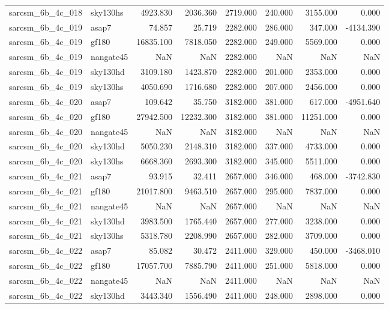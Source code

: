 \begin{tabular}{llrrrrrr}
sarcsm\_6b\_4c\_018 & sky130hs & 4923.830 & 2036.360 & 2719.000 & 240.000 & 3155.000 & 0.000 \\
sarcsm\_6b\_4c\_019 & asap7 & 74.857 & 25.719 & 2282.000 & 286.000 & 347.000 & -4134.390 \\
sarcsm\_6b\_4c\_019 & gf180 & 16835.100 & 7818.050 & 2282.000 & 249.000 & 5569.000 & 0.000 \\
sarcsm\_6b\_4c\_019 & nangate45 & NaN & NaN & 2282.000 & NaN & NaN & NaN \\
sarcsm\_6b\_4c\_019 & sky130hd & 3109.180 & 1423.870 & 2282.000 & 201.000 & 2353.000 & 0.000 \\
sarcsm\_6b\_4c\_019 & sky130hs & 4050.690 & 1716.680 & 2282.000 & 207.000 & 2456.000 & 0.000 \\
sarcsm\_6b\_4c\_020 & asap7 & 109.642 & 35.750 & 3182.000 & 381.000 & 617.000 & -4951.640 \\
sarcsm\_6b\_4c\_020 & gf180 & 27942.500 & 12232.300 & 3182.000 & 381.000 & 11251.000 & 0.000 \\
sarcsm\_6b\_4c\_020 & nangate45 & NaN & NaN & 3182.000 & NaN & NaN & NaN \\
sarcsm\_6b\_4c\_020 & sky130hd & 5050.230 & 2148.310 & 3182.000 & 337.000 & 4733.000 & 0.000 \\
sarcsm\_6b\_4c\_020 & sky130hs & 6668.360 & 2693.300 & 3182.000 & 345.000 & 5511.000 & 0.000 \\
sarcsm\_6b\_4c\_021 & asap7 & 93.915 & 32.411 & 2657.000 & 346.000 & 468.000 & -3742.830 \\
sarcsm\_6b\_4c\_021 & gf180 & 21017.800 & 9463.510 & 2657.000 & 295.000 & 7837.000 & 0.000 \\
sarcsm\_6b\_4c\_021 & nangate45 & NaN & NaN & 2657.000 & NaN & NaN & NaN \\
sarcsm\_6b\_4c\_021 & sky130hd & 3983.500 & 1765.440 & 2657.000 & 277.000 & 3238.000 & 0.000 \\
sarcsm\_6b\_4c\_021 & sky130hs & 5318.780 & 2208.990 & 2657.000 & 282.000 & 3709.000 & 0.000 \\
sarcsm\_6b\_4c\_022 & asap7 & 85.082 & 30.472 & 2411.000 & 329.000 & 450.000 & -3468.010 \\
sarcsm\_6b\_4c\_022 & gf180 & 17057.700 & 7885.790 & 2411.000 & 251.000 & 5818.000 & 0.000 \\
sarcsm\_6b\_4c\_022 & nangate45 & NaN & NaN & 2411.000 & NaN & NaN & NaN \\
sarcsm\_6b\_4c\_022 & sky130hd & 3443.340 & 1556.490 & 2411.000 & 248.000 & 2898.000 & 0.000 \\

\end{tabular}
